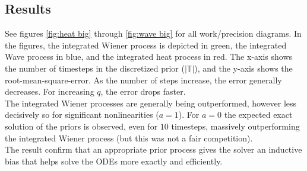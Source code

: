 \subsection*{Results}
See figures \ref{fig:heat big} through \ref{fig:wave big} for all work/precision diagrams. In the figures, the integrated Wiener process is depicted in green, the integrated Wave process in blue, and the integrated heat process in red. The x-axis shows the number of timesteps in the discretized prior ($|\mathbb{T}|$), and the y-axis shows the root-mean-square-error. As the number of steps increase, the error generally decreases. For increasing $q$, the error drops faster.
\\ The integrated Wiener processes are generally being outperformed, however less decisively so for significant nonlinearities ($a = 1$). For $a=0$ the expected exact solution of the priors is observed, even for $10$ timesteps, massively outperforming the integrated Wiener process (but this was not a fair competition).
\\ The result confirm that an appropriate prior process gives the solver an inductive bias that helps solve the ODEs more exactly and efficiently.
